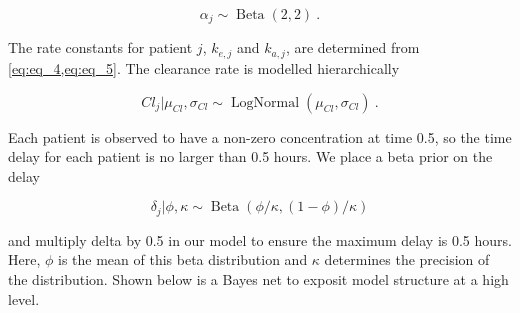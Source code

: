 \begin{equation}\label{eq:eq_7}
\alpha_j \sim \operatorname{Beta}(2,2)  \>.
\end{equation}

\noindent The rate constants for patient $j$,  $k_{e,j}$ and $k_{a,j}$, are determined from \cref{eq:eq_4,eq:eq_5}. The clearance rate is modelled hierarchically

\begin{equation}\label{eq:eq_8}
Cl_j \vert \mu_{Cl}, \sigma_{Cl}  \sim \operatorname{LogNormal}(\mu_{Cl}, \sigma_{Cl}) \>.
\end{equation}

\noindent Each patient is observed to have a non-zero concentration at time 0.5, so the time delay for each patient is no larger than 0.5 hours.  We place a beta prior on the delay

\begin{equation}\label{eq:eq_9}
\delta_j \vert \phi, \kappa \sim \operatorname{Beta}(\phi / \kappa, (1-\phi) / \kappa)
\end{equation}

\noindent and multiply delta by 0.5 in our model to ensure the maximum delay is 0.5 hours.  Here, $\phi$ is the mean of this beta distribution and $\kappa$ determines the precision of the distribution. Shown below is a Bayes net to exposit model structure at a high level.

